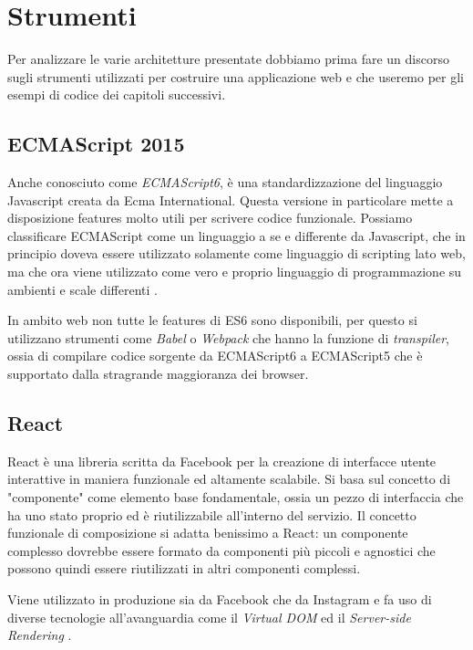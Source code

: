 \chapter{Strumenti}
Per analizzare le varie architetture presentate dobbiamo prima fare un discorso sugli strumenti utilizzati per costruire una applicazione web e che useremo per gli esempi di codice dei capitoli successivi.

\section{ECMAScript 2015}
Anche conosciuto come \textit{ECMAScript6}, è una standardizzazione del linguaggio Javascript creata da Ecma International. Questa versione in particolare mette a disposizione features molto utili per scrivere codice funzionale. Possiamo classificare ECMAScript come un linguaggio a se e differente da Javascript, che in principio doveva essere utilizzato solamente come linguaggio di scripting lato web, ma che ora viene utilizzato come vero e proprio linguaggio di programmazione su ambienti e scale differenti \cite{ECMAScriptDocumentation}.

In ambito web non tutte le features di ES6 sono disponibili, per questo si utilizzano strumenti come \textit{Babel} o \textit{Webpack} che hanno la funzione di \textit{transpiler}, ossia di compilare codice sorgente da ECMAScript6 a ECMAScript5 che è supportato dalla stragrande maggioranza dei browser.

\section{React}
React è una libreria scritta da Facebook per la creazione di interfacce utente interattive in maniera funzionale ed altamente scalabile. Si basa sul concetto di "componente" come elemento base fondamentale, ossia un pezzo di interfaccia che ha uno stato proprio ed è riutilizzabile all'interno del servizio. Il concetto funzionale di composizione si adatta benissimo a React: un componente complesso dovrebbe essere formato da componenti più piccoli e agnostici che possono quindi essere riutilizzati in altri componenti complessi.

Viene utilizzato in produzione sia da Facebook che da Instagram e fa uso di diverse tecnologie all'avanguardia come il \textit{Virtual DOM} ed il \textit{Server-side Rendering} \cite{WheelerOnReact}.